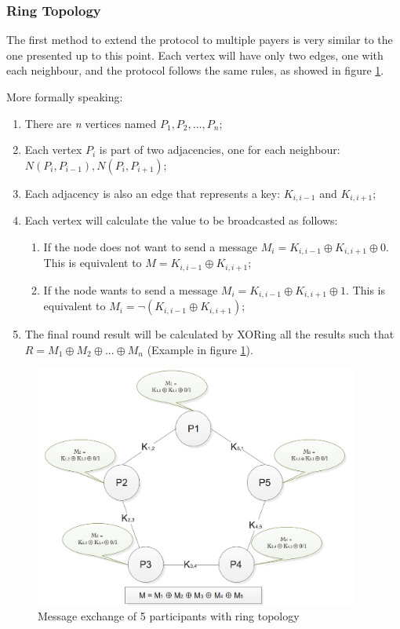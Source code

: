\subsubsection{Ring Topology} \label{sec:ringtopology}
The first method to extend the protocol to multiple payers is very similar to the one presented up to this point. Each vertex will have only two edges, one with each neighbour, and the protocol follows the same rules, as showed in figure \ref{fig:nparticipants1}.

More formally speaking: 
\begin{enumerate}
    \item There are \textit{n} vertices named \textit{$P_1, P_2, ..., P_n$};
    \item Each vertex \textit{$P_i$} is part of two adjacencies, one for each neighbour: \textit{$N(P_i,P_{i-1}), N(P_i, P_{i+1})$};
    \item Each adjacency is also an edge that represents a key: \textit{$K_{i,i-1}$} and \textit{$K_{i,i+1}$};
    \item Each vertex will calculate the value to be broadcasted as follows: \begin{enumerate}
        \item If the node does not want to send a message \textit{$M_i = K_{i,i-1} \oplus K_{i,i+1} \oplus 0 $}. This is equivalent to \textit{$M = K_{i,i-1} \oplus K_{i,i+1}$};
        \item If the node wants to send a message \textit{$M_i = K_{i,i-1} \oplus K_{i,i+1} \oplus 1 $}. This is equivalent to \textit{$M_i = \neg(K_{i,i-1} \oplus K_{i,i+1}) $};
    \end{enumerate}
    \item The final round result will be calculated by XORing all the results such that \textit{$R = M_1 \oplus M_2 \oplus ... \oplus M_n$} (Example in figure \ref{fig:nparticipants1}).
\end{enumerate}


\begin{figure}[h!]
    \centering
    \includegraphics[width=0.95\textwidth]{Images/nparticipants1.png}
    \caption{Message exchange of 5 participants with ring topology}
    \label{fig:nparticipants1}
\end{figure}


